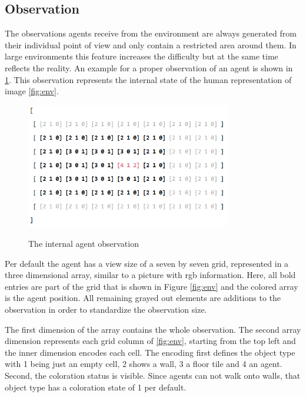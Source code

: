 \subsection{Observation}
The observations agents receive from the environment are always generated from their individual point of view and only contain a restricted area around them. In large environments this feature increases the difficulty but at the same time reflects the reality. An example for a proper observation of an agent is shown in \ref{fig:agent_obs}. This observation represents the internal state of the human representation of image \ref{fig:env}.

\begin{figure}[hpbt]
    \centering
    \includegraphics[width=0.8\textwidth]{pictures/agent_observation}\\
    \caption[Agent Observation]{The internal agent observation}\label{fig:agent_obs}
\end{figure}

Per default the agent has a view size of a seven by seven grid, represented in a three dimensional array, similar to a picture with rgb information. Here, all bold entries are part of the grid that is shown in Figure \ref{fig:env} and the colored array is the agent position. All remaining grayed out elements are additions to the observation in order to standardize the observation size.

The first dimension of the array contains the whole observation. The second array dimension represents each grid column of \ref{fig:env}, starting from the top left and the inner dimension encodes each cell. The encoding first defines the object type with 1 being just an empty cell, 2 shows a wall, 3 a floor tile and 4 an agent. Second, the coloration status is visible. Since agents can not walk onto walls, that object type has a coloration state of 1 per default.

